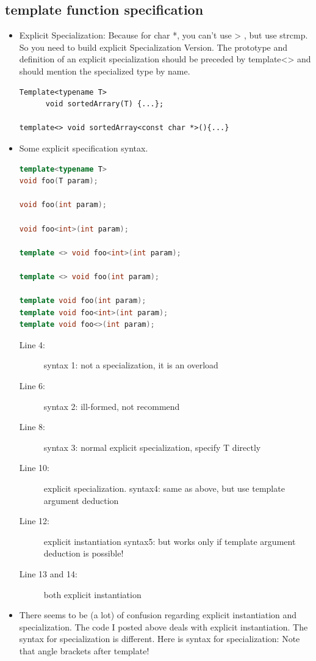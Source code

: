 \documentclass[a4paper,11pt,twoside]{book}
\begin{document}
\subsection{template function specification}
\begin{itemize}

	\item Explicit Specialization: Because for char *, you can't use > , but use strcmp.  So you need to build explicit Specialization Version. The prototype and definition of an explicit specialization should be preceded by template<> and should mention the specialized type by name.
\begin{lstlisting}[numbers=none]
Template<typename T>
      void sortedArrary(T) {...};

template<> void sortedArray<const char *>(){...}
\end{lstlisting}

\item Some explicit specification syntax.
\begin{lstlisting}[frame=single, language=c++]
template<typename T>
void foo(T param);

void foo(int param);

void foo<int>(int param);

template <> void foo<int>(int param);

template <> void foo(int param); 

template void foo(int param);  
template void foo<int>(int param); 
template void foo<>(int param); 
\end{lstlisting}
\begin{description}
	\item[Line 4:] syntax 1: not a specialization, it is an overload
	\item[Line 6:] syntax 2: ill-formed, not recommend
	\item[Line 8:] syntax 3: normal explicit specialization, specify T directly
	\item[Line 10:] explicit specialization. syntax4: same as above, but use template argument deduction
	\item[Line 12:] explicit instantiation syntax5: but works only if template argument deduction is possible!
	\item[Line 13 and 14:] both explicit instantiation
	
\end{description}
\item There seems to be (a lot) of confusion regarding explicit instantiation and specialization. The code I posted above deals with explicit instantiation. The syntax for specialization is different. Here is syntax for specialization: Note that angle brackets after template!


\end{itemize}
\end{document}
